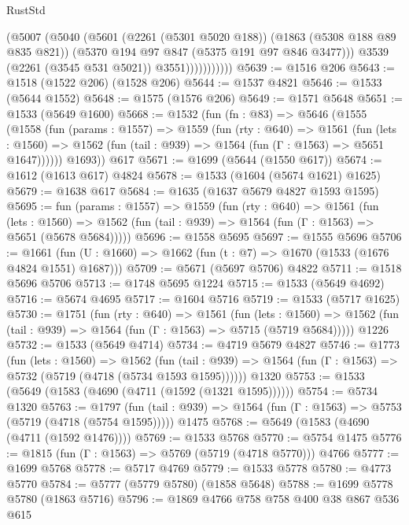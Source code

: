 \begin{lexlean}{RustStd}
\begin{coremodule}
                      (@5007
                        (@5040
                          (@5601
                            (@2261 (@5301 @5020 @188))
                            (@1863 (@5308 @188 @89 @835 @821))
                            (@5370 @194 @97 @847 (@5375 @191 @97 @846 @3477)))
                          @3539
                          (@2261 (@3545 @531 @5021))
                          @3551)))))))))))
@5639 := @1516 @206
@5643 := @1518 (@1522 @206) (@1528 @206)
@5644 := @1537 @4821
@5646 := @1533 (@5644 @1552)
@5648 := @1575 (@1576 @206)
@5649 := @1571 @5648
@5651 := @1533 (@5649 @1600)
@5668 := @1532
    (fun (fn : @83) =>
    @5646
      (@1555
        (@1558
          (fun (params : @1557) =>
          @1559
            (fun (rty : @640) =>
            @1561
              (fun (lets : @1560) =>
              @1562 (fun (tail : @939) => @1564 (fun (Γ : @1563) => @5651 @1647))))))
        @1693))
    @617
@5671 := @1699 (@5644 (@1550 @617))
@5674 := @1612 (@1613 @617) @4824
@5678 := @1533 (@1604 (@5674 @1621) @1625)
@5679 := @1638 @617
@5684 := @1635 (@1637 @5679 @4827 @1593 @1595)
@5695 := fun (params : @1557) =>
  @1559
    (fun (rty : @640) =>
    @1561
      (fun (lets : @1560) =>
      @1562 (fun (tail : @939) => @1564 (fun (Γ : @1563) => @5651 (@5678 @5684)))))
@5696 := @1558 @5695
@5697 := @1555 @5696
@5706 := @1661 (fun (U : @1660) => @1662 (fun (t : @7) => @1670 (@1533 (@1676 @4824 @1551) @1687)))
@5709 := @5671 (@5697 @5706) @4822
@5711 := @1518 @5696 @5706
@5713 := @1748 @5695 @1224
@5715 := @1533 (@5649 @4692)
@5716 := @5674 @4695
@5717 := @1604 @5716
@5719 := @1533 (@5717 @1625)
@5730 := @1751
    (fun (rty : @640) =>
    @1561
      (fun (lets : @1560) =>
      @1562 (fun (tail : @939) => @1564 (fun (Γ : @1563) => @5715 (@5719 @5684)))))
    @1226
@5732 := @1533 (@5649 @4714)
@5734 := @4719 @5679 @4827
@5746 := @1773
    (fun (lets : @1560) =>
    @1562
      (fun (tail : @939) => @1564 (fun (Γ : @1563) => @5732 (@5719 (@4718 (@5734 @1593 @1595))))))
    @1320
@5753 := @1533 (@5649 (@1583 (@4690 (@4711 (@1592 (@1321 @1595))))))
@5754 := @5734 @1320
@5763 := @1797
    (fun (tail : @939) => @1564 (fun (Γ : @1563) => @5753 (@5719 (@4718 (@5754 @1595)))))
    @1475
@5768 := @5649 (@1583 (@4690 (@4711 (@1592 @1476))))
@5769 := @1533 @5768
@5770 := @5754 @1475
@5776 := @1815 (fun (Γ : @1563) => @5769 (@5719 (@4718 @5770))) @4766
@5777 := @1699 @5768
@5778 := @5717 @4769
@5779 := @1533 @5778
@5780 := @4773 @5770
@5784 := @5777 (@5779 @5780) (@1858 @5648)
@5788 := @1699 @5778 @5780 (@1863 @5716)
@5796 := @1869 @4766 @758 @758 @400 @38 @867 @536 @615

\end{coremodule}
\end{lexlean}
